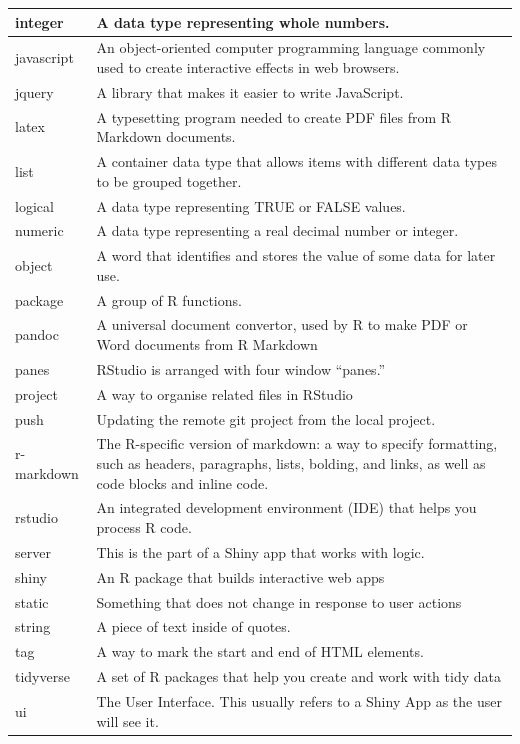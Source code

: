 \documentclass[
  oneside]{book}
\begin{document}
\begin{tabular}{l|l}
\hline
integer & A data type representing whole numbers.\\
\hline
javascript & An object-oriented computer programming language commonly used to create interactive effects in web browsers.\\
\hline
jquery & A library that makes it easier to write JavaScript.\\
\hline
latex & A typesetting program needed to create PDF files from R Markdown documents.\\
\hline
list & A container data type that allows items with different data types to be grouped together.\\
\hline
logical & A data type representing TRUE or FALSE values.\\
\hline
numeric & A data type representing a real decimal number or integer.\\
\hline
object & A word that identifies and stores the value of some data for later use.\\
\hline
package & A group of R functions.\\
\hline
pandoc & A universal document convertor, used by R to make PDF or Word documents from R Markdown\\
\hline
panes & RStudio is arranged with four window “panes.”\\
\hline
project & A way to organise related files in RStudio\\
\hline
push & Updating the remote git project from the local project.\\
\hline
r-markdown & The R-specific version of markdown: a way to specify formatting, such as headers, paragraphs, lists, bolding, and links, as well as code blocks and inline code.\\
\hline
rstudio & An integrated development environment (IDE) that helps you process R code.\\
\hline
server & This is the part of a Shiny app that works with logic.\\
\hline
shiny & An R package that builds interactive web apps\\
\hline
static & Something that does not change in response to user actions\\
\hline
string & A piece of text inside of quotes.\\
\hline
tag & A way to mark the start and end of HTML elements.\\
\hline
tidyverse & A set of R packages that help you create and work with tidy data\\
\hline
ui & The User Interface. This usually refers to a Shiny App as the user will see it.\\

\end{tabular}
\end{document}
